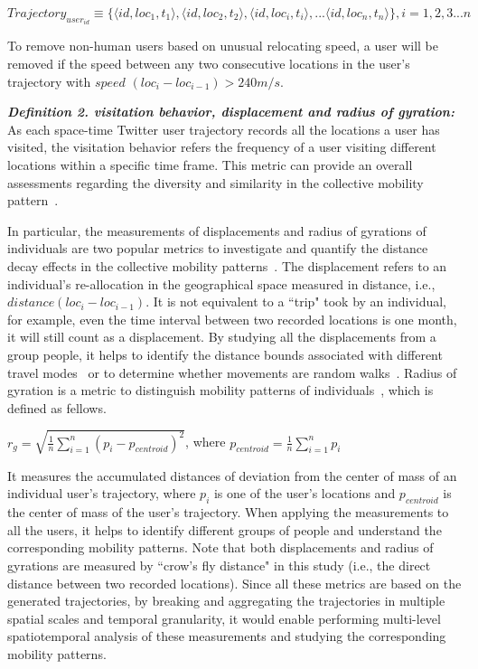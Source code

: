 \documentclass[ijgi,article,submit,moreauthors,pdftex,10pt,a4paper]{mdpi}
\theoremstyle{mdpi}
\newcounter{ex}
\newcounter{re}
\theoremstyle{mdpidefinition}
\begin{document}
$Trajectory_{user_{id}} \equiv \lbrace \langle id, loc_{1}, t_{1}\rangle, \langle id, loc_{2}, t_{2}\rangle, \langle id, loc_{i}, t_{i}\rangle, ... \langle id, loc_{n}, t_{n}\rangle \rbrace, i = 1, 2, 3...n$
\newline

To remove non-human users based on unusual relocating speed, a user will be removed if the speed between any two consecutive locations in the user's trajectory with $speed$ $(loc_{i} - loc_{i-1}) > 240 m/s $.
\newline

\noindent\emph{\textbf{Definition 2. visitation behavior, displacement and radius of gyration:}} As each space-time Twitter user trajectory records all the locations a user has visited, the visitation behavior refers the frequency of a user visiting different locations within a specific time frame.
This metric can provide an overall assessments regarding the diversity and similarity in the collective mobility pattern~\cite{gao2012exploring}.

In particular, the measurements of displacements and radius of gyrations of individuals are two popular metrics to investigate and quantify the distance decay effects in the collective mobility patterns~\cite{gonzalez2008understanding}.
The displacement refers to an individual's re-allocation in the geographical space measured in distance, i.e., $distance (loc_{i} - loc_{i-1})$. It is not equivalent to a ``trip" took by an individual, for example, even the time interval between two recorded locations is one month, it will still count as a displacement.  
By studying all the displacements from a group people, it helps to identify the distance bounds associated with different travel modes~\cite{Jurdak2015} or to determine whether movements are random walks~\cite{brockmann2006scaling}.
Radius of gyration is a metric to distinguish mobility patterns of individuals~\cite{gonzalez2008understanding}, which is defined as fellows.   
\newline

$r_{g} = \sqrt{\frac{1}{n}\sum_{i=1}^{n}(p_{i} -  p_{centroid})^{2}}$, where $p_{centroid} = \frac{1}{n}\sum_{i=1}^{n}p_{i}$
\newline

\noindent It measures the accumulated distances of deviation from the center of mass of an individual user's trajectory, where $p_{i}$ is one of the user's locations and $p_{centroid}$ is the center of mass of the user's trajectory. When applying the measurements to all the users, it helps to identify different groups of people and understand the corresponding mobility patterns. Note that both displacements and radius of gyrations are measured by ``crow's fly distance" in this study (i.e., the direct distance between two recorded locations).
Since all these metrics are based on the generated trajectories, by breaking and aggregating the trajectories in multiple spatial scales and temporal granularity, it would enable performing multi-level spatiotemporal analysis of these measurements and studying the corresponding mobility patterns. 
\end{document}
